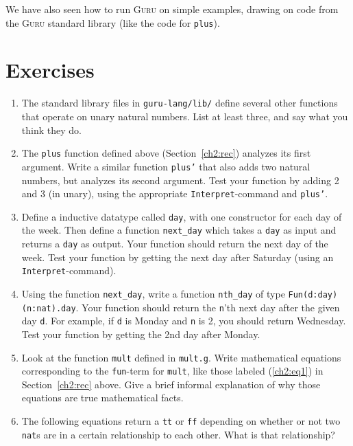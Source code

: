 \documentclass{book}[12pt]
\newcommand{\guru}[0]{\textsc{Guru}\xspace}
\begin{document}
 \noindent We have also seen how to run \guru on simple examples,
drawing on code from the \guru standard library (like the code for
\texttt{plus}).

\section{Exercises}

\begin{enumerate}

\item The standard library files in \texttt{guru-lang/lib/} define
several other functions that operate on unary natural numbers.  List
at least three, and say what you think they do.

\item The \texttt{plus} function defined above (Section~\ref{ch2:rec})
analyzes its first argument.  Write a similar function \texttt{plus'}
that also adds two natural numbers, but analyzes its second argument.
Test your function by adding 2 and 3 (in unary), using the appropriate
\texttt{Interpret}-command and \texttt{plus'}.

\item Define a inductive datatype called \texttt{day}, with one
constructor for each day of the week.  Then define a function
\texttt{next\_day} which takes a \texttt{day} as input and returns a
\texttt{day} as output.  Your function should return the next day of
the week.  Test your function by getting the next day after Saturday
(using an \texttt{Interpret}-command).

\item Using the function \texttt{next\_day}, write a function \texttt{nth\_day}
of type \texttt{Fun(d:day)(n:nat).day}.  Your function should return the \texttt{n}'th
next day after the given day \texttt{d}.  For example, if \texttt{d} is Monday and
\texttt{n} is 2, you should return Wednesday.  Test your function by getting
the 2nd day after Monday.

\item Look at the function \texttt{mult} defined in \texttt{mult.g}.
Write mathematical equations corresponding to the \texttt{fun}-term
for \texttt{mult}, like those labeled (\ref{ch2:eq1}) in
Section~\ref{ch2:rec} above.  Give a brief informal explanation of why
those equations are true mathematical facts.

\item The following equations return a \texttt{tt} or \texttt{ff} depending
on whether or not two \texttt{nat}s are in a certain relationship to each
other.  What is that relationship?


\end{enumerate}
\end{document}
